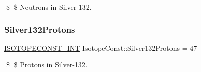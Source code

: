 \$ \$ Neutrons in Silver-\/132. \mbox{\label{group___isotope_const-_silver-_ag132_gadc1ebc2309f6dd8454e66a5ab7db6ffa}} 
\subsubsection{\texorpdfstring{Silver132\+Protons}{Silver132Protons}}
{\footnotesize\ttfamily \mbox{\hyperlink{group___isotope_const-_macros_ga5f18360b3e99483a35c32d789e62621c}{I\+S\+O\+T\+O\+P\+E\+C\+O\+N\+S\+T\+\_\+\+I\+NT}} Isotope\+Const\+::\+Silver132\+Protons = 47}

\$ \$ Protons in Silver-\/132. 